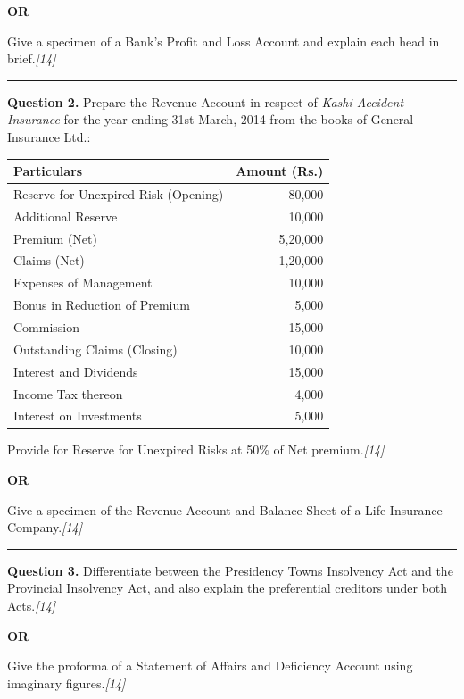 \documentclass[11pt,a4paper]{article}
\newcommand{\pts}[1]{\hfill   \textit{[#1]}}
\begin{document}
\centerline{   \textbf{OR}}

Give a specimen of a Bank's Profit and Loss Account and explain each head in brief.\pts{14}

\medskip\rule{\linewidth}{0.2pt}

\pagebreak




\noindent   \textbf{Question 2.}
Prepare the Revenue Account in respect of   \textit{Kashi Accident Insurance} for the year ending 31st March, 2014 from the books of General Insurance Ltd.:


\begin{center}
\small

\begin{tabular}{|l|r|}
\hline
   \textbf{Particulars} &   \textbf{Amount (Rs.)} \\
\hline
Reserve for Unexpired Risk (Opening) & 80,000 \\
Additional Reserve & 10,000 \\
Premium (Net) & 5,20,000 \\
Claims (Net) & 1,20,000 \\
Expenses of Management & 10,000 \\
Bonus in Reduction of Premium & 5,000 \\
Commission & 15,000 \\
Outstanding Claims (Closing) & 10,000 \\
Interest and Dividends & 15,000 \\
Income Tax thereon & 4,000 \\
Interest on Investments & 5,000 \\
\hline
\end{tabular}
\end{center}
Provide for Reserve for Unexpired Risks at 50\% of Net premium.\pts{14}

\centerline{   \textbf{OR}}

Give a specimen of the Revenue Account and Balance Sheet of a Life Insurance Company.\pts{14}

\medskip\rule{\linewidth}{0.2pt}




\noindent   \textbf{Question 3.}
Differentiate between the Presidency Towns Insolvency Act and the Provincial Insolvency Act, and also explain the preferential creditors under both Acts.\pts{14}

\centerline{   \textbf{OR}}

Give the proforma of a Statement of Affairs and Deficiency Account using imaginary figures.\pts{14}
\end{document}
